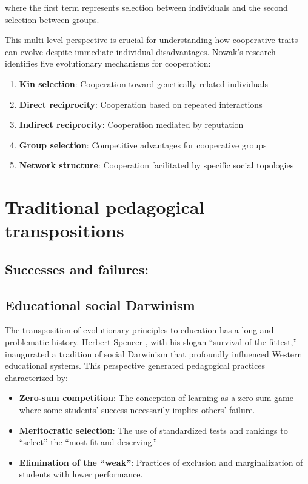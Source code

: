 where the first term represents selection between individuals and the second selection between groups.

This multi-level perspective is crucial for understanding how cooperative traits can evolve despite immediate individual disadvantages. Nowak's research \cite{Nowak2006} identifies five evolutionary mechanisms for cooperation:

\begin{enumerate}
	\item \textbf{Kin selection}: Cooperation toward genetically related individuals
	\item \textbf{Direct reciprocity}: Cooperation based on repeated interactions
	\item \textbf{Indirect reciprocity}: Cooperation mediated by reputation
	\item \textbf{Group selection}: Competitive advantages for cooperative groups
	\item \textbf{Network structure}: Cooperation facilitated by specific social topologies
\end{enumerate}

\section{Traditional pedagogical transpositions}
\subsection*{Successes and failures:}
\subsection{Educational social Darwinism}

The transposition of evolutionary principles to education has a long and problematic history. Herbert Spencer \cite{Spencer1864}, with his slogan ``survival of the fittest,'' inaugurated a tradition of social Darwinism that profoundly influenced Western educational systems. This perspective generated pedagogical practices characterized by:

\begin{itemize}
	\item \textbf{Zero-sum competition}: The conception of learning as a zero-sum game where some students' success necessarily implies others' failure.
	\item \textbf{Meritocratic selection}: The use of standardized tests and rankings to ``select'' the ``most fit and deserving.''
	\item \textbf{Elimination of the ``weak''}: Practices of exclusion and marginalization of students with lower performance.
\end{itemize}

